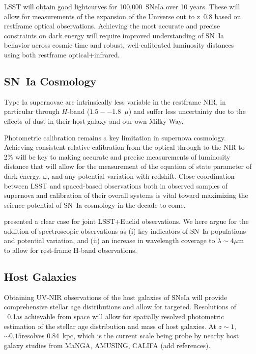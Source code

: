 \documentclass{aastex}
\newcommand{\tbd}{{\color{red}}}
\begin{document}
LSST will obtain good lightcurves for 100,000~SNeIa over 10 years.  These will allow for measurements of the expansion of the Universe out to z~0.8 based on restframe optical observations.  Achieving the most accurate and precise constraints on dark energy will require improved understanding of SN~Ia behavior across cosmic time and robust, well-calibrated luminosity distances using both restframe optical+infrared.

\subsection{SN~Ia Cosmology}

Type Ia supernovae are intrinsically less variable in the restframe NIR, in particular through $H$-band ($1.5--1.8$~$\mu$) \citep{Krisciunas, Wood-Vasey, CSP} and suffer less uncertainty due to the effects of dust in their host galaxy and our own Milky Way.

Photometric calibration remains a key limitation in supernova cosmology\citep[c.f.][]{Scolnic}.  Achieving consistent relative calibration from the optical through to the NIR to 2\% will be key to making accurate and precise measurements of luminosity distance that will allow for the measurement of the equation of state parameter of dark energy, $\omega$, and any potential variation with redshift.  Close coordination between LSST and spaced-based observations both in observed samples of supernova and calibration of their overall systems is vital toward maximizing the science potential of SN~Ia cosmology in the decade to come. 

\citet{Astier14} presented a clear case for joint LSST+Euclid observations.  We here argue for the addition of spectroscopic observations as (i) key indicators of SN~Ia populations and potential variation, and (ii) an increase in wavelength coverage to $\lambda\sim4\mu$m to allow for rest-frame H-band observations.

\subsection{Host Galaxies}

Obtaining UV-NIR observations of the host galaxies of SNeIa will provide comprehensive stellar age distributions and allow for targeted.  Resolutions of ~0.1\arcsec as achievable from space will allow for spatially resolved photometric estimation of the stellar age distribution and mass of host galaxies.  At $z\sim1$, $\sim0.15$\arcsec resolves 0.84~kpc, which is the current scale being probe by nearby host galaxy studies from MaNGA, AMUSING, CALIFA ({\tbd add references}).
\end{document}
